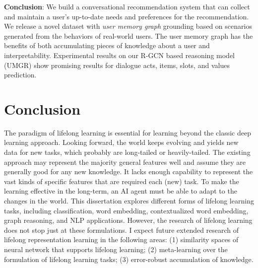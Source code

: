 \textbf{Conclusion}:
We build a conversational recommendation system that can collect and maintain a user's up-to-date needs and preferences for the recommendation.
We release a novel dataset with \textit{user memory graph} grounding based on scenarios generated from the behaviors of real-world users.
The user memory graph has the benefits of both accumulating pieces of knowledge about a user and interpretability.
Experimental results on our R-GCN based reasoning model (UMGR) show promising results for dialogue acts, items, slots, and values prediction.

\chapter{Conclusion}
The paradigm of lifelong learning is essential for learning beyond the classic deep learning approach.
Looking forward, the world keeps evolving and yields new data for new tasks, which probably are long-tailed or heavily-tailed.
The existing approach may represent the majority general features well and assume they are generally good for any new knowledge.
It lacks enough capability to represent the vast kinds of specific features that are required each (new) task.
To make the learning effective in the long-term, an AI agent must be able to adapt to the changes in the world.
This dissertation explores different forms of lifelong learning tasks, including classification, word embedding, contextualized word embedding, graph reasoning, and NLP applications.
However, the research of lifelong learning does not stop just at these formulations.
I expect future extended research of lifelong representation learning in the following areas: (1) similarity spaces of neural network that supports lifelong learning; (2) meta-learning over the formulation of lifelong learning tasks; (3) error-robust accumulation of knowledge.